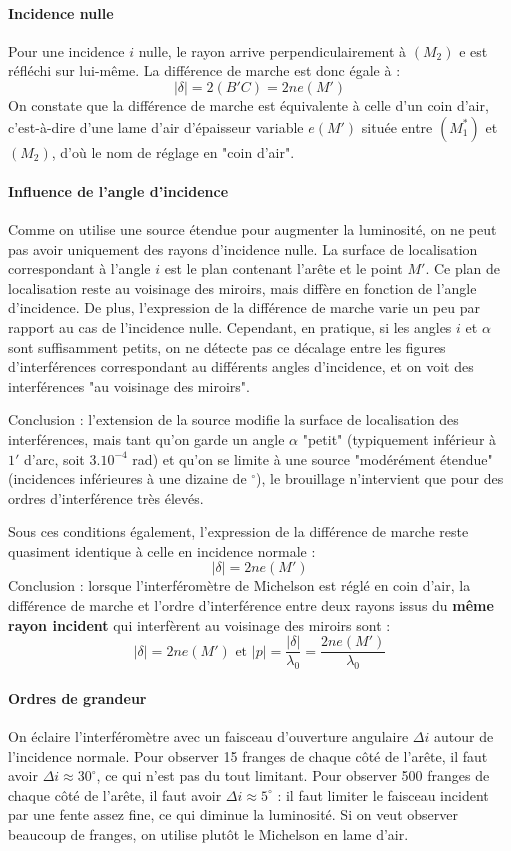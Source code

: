 \documentclass[french]{book}
\theoremstyle{plain}
\theoremstyle{definition}
\theoremstyle{remark}
\newcommand{\st}{^*}
\begin{document}
\paragraph{Incidence nulle} Pour une incidence $i$ nulle, le rayon arrive perpendiculairement à $(M_2)$ e est réfléchi sur lui-même. La différence de marche est donc égale à : $$\lvert\delta\rvert=2(B'C)=2ne(M')$$ On constate que la différence de marche est équivalente à celle d'un coin d'air, c'est-à-dire d'une lame d'air d'épaisseur variable $e(M')$ située entre $(M_1\st)$ et $(M_2)$, d'où le nom de réglage en "coin d'air".
\paragraph{Influence de l'angle d'incidence} Comme on utilise une source étendue pour augmenter la luminosité, on ne peut pas avoir uniquement des rayons d'incidence nulle. La surface de localisation correspondant à l'angle $i$ est le plan contenant l'arête et le point $M'$. Ce plan de localisation reste au voisinage des miroirs, mais diffère en fonction de l'angle d'incidence. De plus, l'expression de la  différence de marche varie un peu par rapport au cas de l'incidence nulle. Cependant, en pratique, si les angles $i$ et $\alpha$ sont suffisamment petits, on ne détecte pas ce décalage entre les figures d'interférences correspondant au différents angles d'incidence, et on voit des interférences "au voisinage des miroirs". \\ \par Conclusion : l'extension de la source modifie la surface de localisation des interférences, mais tant qu'on garde un angle $\alpha$ "petit" (typiquement inférieur à $1'$ d'arc, soit $3.10^{-4}$ rad) et qu'on se limite à une source "modérément étendue" (incidences inférieures à une dizaine de $^\circ$), le brouillage n'intervient que pour des ordres d'interférence très élevés. \\ \par Sous ces conditions également, l'expression de la différence de marche reste quasiment identique à celle en incidence normale : $$\lvert\delta\rvert=2ne(M')$$ Conclusion : lorsque l'interféromètre de Michelson est réglé en coin d'air, la différence de marche et l'ordre d'interférence entre deux rayons issus du \textbf{même rayon incident} qui interfèrent au voisinage des miroirs sont : $$\lvert\delta\rvert=2ne(M')\text{  et  }\lvert p\rvert=\frac{\lvert\delta\rvert}{\lambda_0}=\frac{2ne(M')}{\lambda_0}$$
\paragraph{Ordres de grandeur} On éclaire l'interféromètre avec un faisceau d'ouverture angulaire $\Delta i$ autour de l'incidence normale. Pour observer 15 franges de chaque côté de l'arête, il faut avoir $\Delta i\approx 30^\circ$, ce qui n'est pas du tout limitant. Pour observer 500 franges de chaque côté de l'arête, il faut avoir $\Delta i\approx 5^\circ$ : il faut limiter le faisceau incident par une fente assez fine, ce qui diminue la luminosité. Si on veut observer beaucoup de franges, on utilise plutôt le Michelson en lame d'air.
\end{document}
